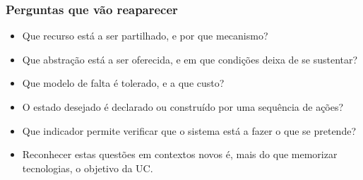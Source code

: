 \documentclass[aspectratio=169]{beamer}
\begin{document}
\begin{frame}
\frametitle{Perguntas que vão reaparecer}
\begin{itemize}
    \setlength\itemsep{0.3cm}
    \item Que recurso está a ser partilhado, e por que mecanismo?
    \item Que abstração está a ser oferecida, e em que condições deixa de se sustentar?
    \item Que modelo de falta é tolerado, e a que custo?
    \item O estado desejado é declarado ou construído por uma sequência de ações?
    \item Que indicador permite verificar que o sistema está a fazer o que se pretende?
    \item Reconhecer estas questões em contextos novos é, mais do que memorizar tecnologias, o objetivo da UC.
\end{itemize}
\end{frame}
\end{document}
